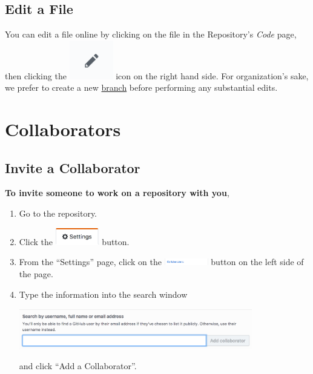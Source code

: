 \documentclass[11pt]{article}
\begin{document}
\subsection{Edit a File}

You can edit a file online by clicking on the file in the Repository's \textit{Code} page, then clicking the \includegraphics[width=0.75in]{pencil} icon on the right hand side. For organization's sake, we prefer to create a new \hyperlink{branch-section}{branch} before performing any substantial edits. 

\section{Collaborators}

\subsection{Invite a Collaborator} 

\textbf{To invite someone to work on a repository with you},

\begin{enumerate}
\item Go to the repository.
\item Click the \includegraphics[width=0.75in]{SettingsButton} button.  
\item From the ``Settings'' page, click on the \includegraphics[width=0.75in]{CollaboratorsButton} button on the left side of the page.
\item Type the information into the search window \begin{center} 
\includegraphics[width=0.8\textwidth]{CollaboratorSearchImage}
\end{center}
and click ``Add a Collaborator''. 
\end{enumerate}
\end{document}
